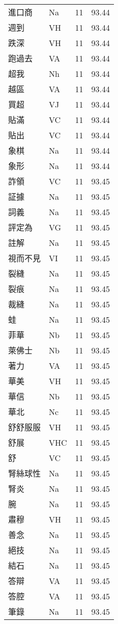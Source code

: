 \documentclass[twocolumn]{book}
\begin{document}
\begin{supertabular}{llrr}
進口商 & Na & 11 &  93.44\\
週到 & VH & 11 &  93.44\\
跌深 & VH & 11 &  93.44\\
跑過去 & VA & 11 &  93.44\\
超我 & Nh & 11 &  93.44\\
越區 & VA & 11 &  93.44\\
買超 & VJ & 11 &  93.44\\
貼滿 & VC & 11 &  93.44\\
貼出 & VC & 11 &  93.44\\
象棋 & Na & 11 &  93.44\\
象形 & Na & 11 &  93.44\\
詐領 & VC & 11 &  93.45\\
証據 & Na & 11 &  93.45\\
詞義 & Na & 11 &  93.45\\
評定為 & VG & 11 &  93.45\\
註解 & Na & 11 &  93.45\\
視而不見 & VI & 11 &  93.45\\
裂縫 & Na & 11 &  93.45\\
裂痕 & Na & 11 &  93.45\\
裁縫 & Na & 11 &  93.45\\
蛙 & Na & 11 &  93.45\\
菲華 & Nb & 11 &  93.45\\
萊佛士 & Nb & 11 &  93.45\\
著力 & VA & 11 &  93.45\\
華美 & VH & 11 &  93.45\\
華信 & Nb & 11 &  93.45\\
華北 & Nc & 11 &  93.45\\
舒舒服服 & VH & 11 &  93.45\\
舒展 & VHC & 11 &  93.45\\
舒 & VC & 11 &  93.45\\
腎絲球性 & Na & 11 &  93.45\\
腎炎 & Na & 11 &  93.45\\
腕 & Na & 11 &  93.45\\
肅穆 & VH & 11 &  93.45\\
善念 & Na & 11 &  93.45\\
絕技 & Na & 11 &  93.45\\
結石 & Na & 11 &  93.45\\
答辯 & VA & 11 &  93.45\\
答腔 & VA & 11 &  93.45\\
筆錄 & Na & 11 &  93.45\\

\end{supertabular}
\end{document}

